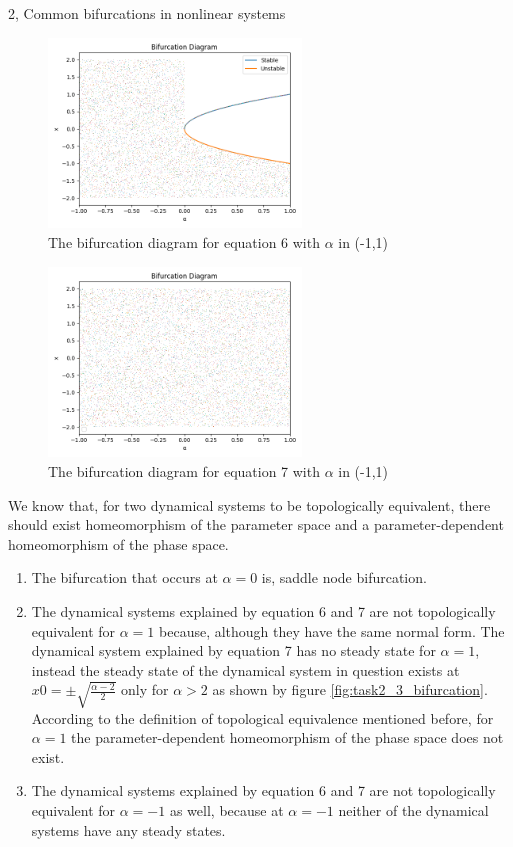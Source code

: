 \documentclass[10pt,a4paper]{article}
\begin{document}
\begin{task}{2, Common bifurcations in nonlinear systems}
     \begin{figure}[H]
        \centering
        \includegraphics[width=0.6\textwidth]{../plots/task2_1.png}
        \caption{The bifurcation diagram for equation 6 with $\alpha$ in (-1,1)}
        \label{fig:task2_1_bifurcation}
    \end{figure}    
    \begin{figure}[H]
        \centering
        \includegraphics[width=0.6\textwidth]{../plots/task2_2.png}
        \caption{The bifurcation diagram for equation 7 with $\alpha$ in (-1,1)}
        \label{fig:task2_2_bifurcation}
    \end{figure}
	
	We know that, for two dynamical systems to be topologically equivalent, there should exist homeomorphism of the parameter space and a parameter-dependent homeomorphism of the phase space.
	
	\begin{enumerate}
		\item The bifurcation that occurs at $\alpha=0$ is, saddle node bifurcation.
		\item The dynamical systems explained by equation 6 and 7 are not topologically equivalent for $\alpha=1$ because, although they have the same normal form. The dynamical system explained by equation 7 has no steady state for $\alpha=1$, instead the steady state of the dynamical system in question exists at $x0 = \pm \sqrt{\frac{\alpha -2}{2}}$ only for $\alpha > 2$ as shown by figure \ref{fig:task2_3_bifurcation}. According to the definition of topological equivalence mentioned before, for $\alpha=1$ the parameter-dependent homeomorphism of the phase space does not exist.
		\item The dynamical systems explained by equation 6 and 7 are not topologically equivalent for $\alpha=-1$ as well, because at $\alpha=-1$ neither of the dynamical systems have any steady states.
	\end{enumerate}	        
    

\end{task}
\end{document}
